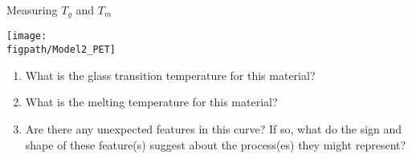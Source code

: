 \begin{activity}{Measuring $T_g$ and $T_m$}
\begin{ctqs}
		\vspace{6pt}
		\centerline{\texttt{[image: \\figpath/Model2\_PET]}}
	
		\begin{enumerate}
			\item What is the glass transition temperature for this material?
			
				\begin{solution}[0.5in]
				\end{solution}
			
			\item What is the melting temperature for this material?
			
				\begin{solution}[0.5in]
				\end{solution}
			
			\item Are there any unexpected features in this curve? If so, what do the sign and shape of these feature(s) suggest about the process(es) they might represent?
			
				\begin{solution}[2in]
				\end{solution}
		\end{enumerate}
	
\end{ctqs}






	


%
%	


	
\end{activity}